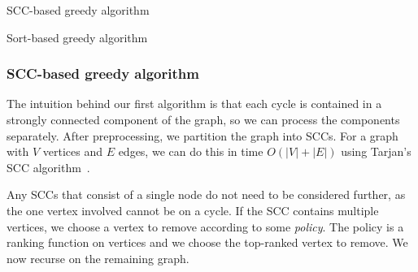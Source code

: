 \begin{algorithm}[t]
\SetAlgoLined\DontPrintSemicolon
{}


\caption{SCC-based greedy algorithm}
\label{alg:scc}
\end{algorithm}


\begin{algorithm}[t]
\SetAlgoLined\DontPrintSemicolon
{}
\caption{Sort-based greedy algorithm}
\label{alg:sort}
\end{algorithm}




\subsubsection{SCC-based greedy algorithm}

The intuition behind our first algorithm is that each cycle is contained in a strongly connected component of the graph, so we can process the components separately. After preprocessing, we partition the graph into SCCs. For a graph with $V$ vertices and $E$ edges, we can do this in time $O(|V|+|E|)$ using Tarjan's SCC algorithm~\cite{tarjan1972depth}.

Any SCCs that consist of a single node do not need to be considered further, as the one vertex involved cannot be on a cycle. If the SCC contains multiple vertices, we choose a vertex to remove according to some \emph{policy}. The policy is a ranking function on vertices and we choose the top-ranked vertex to remove. We now recurse on the remaining graph.

